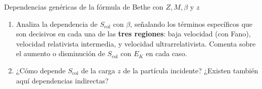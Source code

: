 \begin{Ejercicio}{Dependencias genéricas de la fórmula de Bethe con $Z, M, \beta$ y $z$}
\begin{enumerate}[label=\alph*)]
\item Analiza la dependencia de $S_\text{col}$ con $\beta$, señalando los términos específicos que 
son decisivos en cada una de las \textbf{tres regiones}:  
baja velocidad (con Fano), velocidad relativista intermedia, y velocidad ultrarrelativista.  
Comenta sobre el aumento o disminución de $S_\text{col}$ con $E_K$ en cada caso.

\item ¿Cómo depende $S_\text{col}$ de la carga $z$ de la partícula incidente?  
¿Existen también aquí dependencias indirectas?

\end{enumerate}

\end{Ejercicio}


